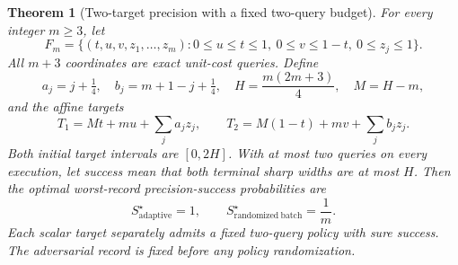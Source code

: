 \documentclass[12pt]{article}
\newtheorem{theorem}{Theorem}
\begin{document}
\begin{theorem}[Two-target precision with a fixed two-query budget]
\label{thm:two-target-collapse}
For every integer $m\geq3$, let
\[
 F_m=\{(t,u,v,z_1,\ldots,z_m):0\leq u\leq t\leq1,
             \ 0\leq v\leq1-t,\ 0\leq z_j\leq1\}.
\]
All $m+3$ coordinates are exact unit-cost queries. Define
\[
 a_j=j+\tfrac14,\quad b_j=m+1-j+\tfrac14,\quad
 H=\frac{m(2m+3)}4,\quad M=H-m,
\]
and the affine targets
\[
 T_1=Mt+mu+\sum_j a_jz_j,\qquad
 T_2=M(1-t)+mv+\sum_j b_jz_j.
\]
Both initial target intervals are $[0,2H]$. With at most two queries on
every execution, let success mean that both terminal sharp widths are at
most $H$. Then the optimal worst-record precision-success probabilities are
\[
 S^{\star}_{\mathrm{adaptive}}=1,\qquad
 S^{\star}_{\mathrm{randomized\ batch}}=\frac1m.
\]
Each scalar target separately admits a fixed two-query policy with sure
success. The adversarial record is fixed before any policy randomization.
\end{theorem}
\end{document}
